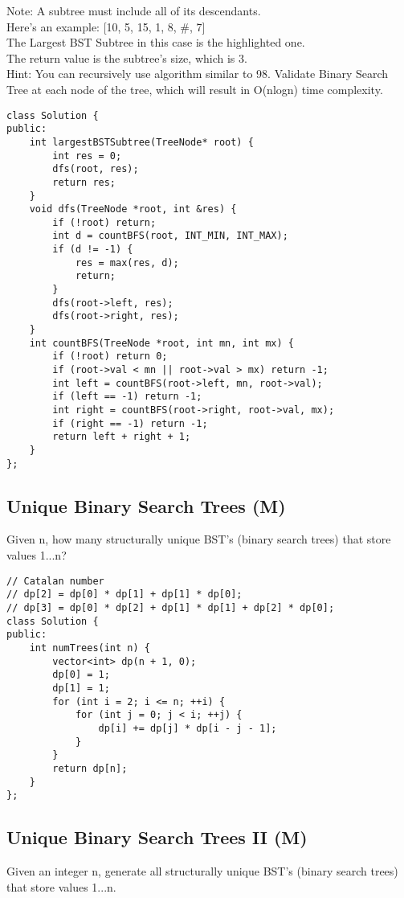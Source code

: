 Note: A subtree must include all of its descendants.\\

Here's an example: [10, 5, 15, 1, 8, \#, 7]\\
The Largest BST Subtree in this case is the highlighted one. \\
The return value is the subtree's size, which is 3.\\

Hint: You can recursively use algorithm similar to 98. Validate Binary Search Tree at each node of the tree, which will result in O(nlogn) time complexity.\\

\begin{lstlisting}
class Solution {
public:
    int largestBSTSubtree(TreeNode* root) {
        int res = 0;
        dfs(root, res);
        return res;
    }
    void dfs(TreeNode *root, int &res) {
        if (!root) return;
        int d = countBFS(root, INT_MIN, INT_MAX);
        if (d != -1) {
            res = max(res, d);
            return;
        }
        dfs(root->left, res);
        dfs(root->right, res);
    }
    int countBFS(TreeNode *root, int mn, int mx) {
        if (!root) return 0;
        if (root->val < mn || root->val > mx) return -1;
        int left = countBFS(root->left, mn, root->val);
        if (left == -1) return -1;
        int right = countBFS(root->right, root->val, mx);
        if (right == -1) return -1;
        return left + right + 1;
    }
};
\end{lstlisting}


\subsection{Unique Binary Search Trees (M)}
Given n, how many structurally unique BST's (binary search trees) that store values 1...n?

\begin{lstlisting}
// Catalan number
// dp[2] = dp[0] * dp[1] + dp[1] * dp[0];
// dp[3] = dp[0] * dp[2] + dp[1] * dp[1] + dp[2] * dp[0];
class Solution {
public:
    int numTrees(int n) {
        vector<int> dp(n + 1, 0);
        dp[0] = 1;
        dp[1] = 1;
        for (int i = 2; i <= n; ++i) {          
            for (int j = 0; j < i; ++j) {
                dp[i] += dp[j] * dp[i - j - 1];
            }
        }
        return dp[n];
    }
};
\end{lstlisting}


\subsection{Unique Binary Search Trees II (M)}
Given an integer n, generate all structurally unique BST's (binary search trees) that store values 1...n.

